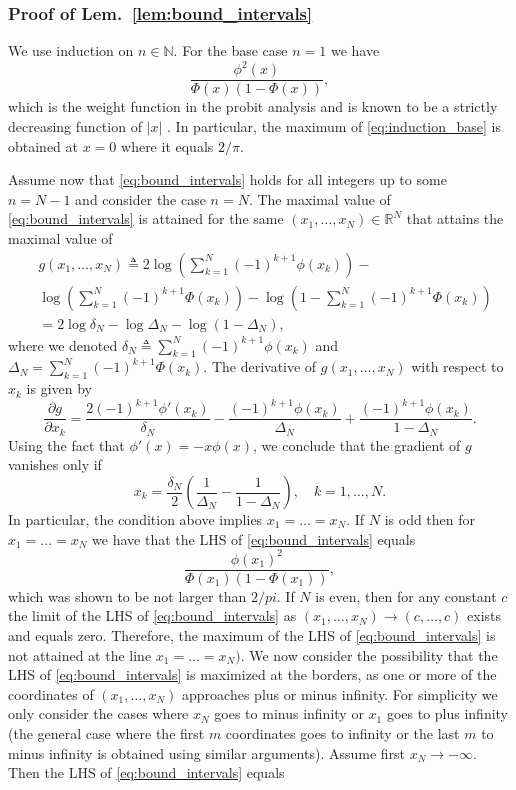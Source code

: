 \documentclass[letterpaper, conference,9pt]{IEEEtran}      %
\begin{document}
\subsubsection*{Proof of Lem.~\ref{lem:bound_intervals}}
We use induction on $n \in \mathbb N$. For the base case $n=1$ we have 
\begin{equation} \label{eq:induction_base}
\frac{  \phi^2(x)} 
{\Phi(x) \left(1 - \Phi(x) \right) },
\end{equation}
which is the weight function in the probit analysis and is known to be a strictly decreasing function of $|x|$ \cite{Samford1953}. 
In particular, the maximum of \eqref{eq:induction_base} is obtained at $x=0$ where it equals $2/\pi$. \par
Assume now that \eqref{eq:bound_intervals} holds for all integers up to some $n = N-1$ and consider the case $n = N$. The maximal value of \eqref{eq:bound_intervals} is attained for the same $(x_1,\ldots,x_N) \in \mathbb R^N$ that attains the maximal value of 
\begin{align*}
& g(x_1,\ldots, x_N) \triangleq 2 \log \left(  \sum_{k=1}^{N} (-1)^{k+1} \phi(x_k) \right) - \\
&  \log
\left( \sum_{k=1}^N (-1)^{k+1} \Phi(x_k) \right)
-\log \left(1 -  \sum_{k=1}^N (-1)^{k+1} \Phi(x_k) \right) \\
& = 2 \log \delta_N - \log \Delta_N - \log \left(1 - \Delta_N  \right),
\end{align*}
where we denoted $\delta_N \triangleq \sum_{k=1}^{N} (-1)^{k+1} \phi(x_k)$ and $\Delta_N =  \sum_{k=1}^N (-1)^{k+1} \Phi(x_k)$. The derivative of $g(x_1,\ldots,x_N)$ with respect to $x_k$ is given by
\[
\frac{\partial  g}{\partial x_k} = \frac{2 (-1)^{k+1} \phi'(x_k)}{\delta_N} -\frac{(-1)^{k+1} \phi(x_k)}{\Delta_N } + \frac{(-1)^{k+1} \phi(x_k)}{1-\Delta_N }.
\]
Using the fact that $\phi'(x) = -x \phi(x)$, we conclude that the gradient of $g$ vanishes only if
\[
x_k = \frac{\delta_N}{2} \left( \frac{1}{\Delta_N} - \frac{1}{1-\Delta_N} \right),\quad k=1,\ldots,N.
\]
In particular, the condition above implies $x_1 = \ldots = x_N$. If $N$ is odd then for $x_1=\ldots =x_N$ we have that the LHS of \eqref{eq:bound_intervals} equals
\[
\frac{\phi(x_1)^2}{ \Phi(x_1) (1 - \Phi(x_1))},
\]
which was shown to be not larger than $2/pi$. If $N$ is even, then for any constant $c$ the limit of the LHS of \eqref{eq:bound_intervals} as $(x_1,\ldots,x_N)\rightarrow (c,\ldots,c)$ exists and equals zero. Therefore, the maximum of the LHS of \eqref{eq:bound_intervals} is not attained at the line $x_1=\ldots=x_N)$. We now consider the possibility that the LHS of \eqref{eq:bound_intervals} is maximized at the borders, as one or more of the coordinates of $(x_1,\ldots,x_N)$ approaches plus or minus infinity. For simplicity we only consider the cases where $x_N$ goes to minus infinity or $x_1$ goes to plus infinity (the general case where the first $m$ coordinates goes to infinity or the last $m$ to minus infinity is obtained using similar arguments). Assume first $x_N \rightarrow -\infty$. Then the LHS of \eqref{eq:bound_intervals} equals
\end{document}
